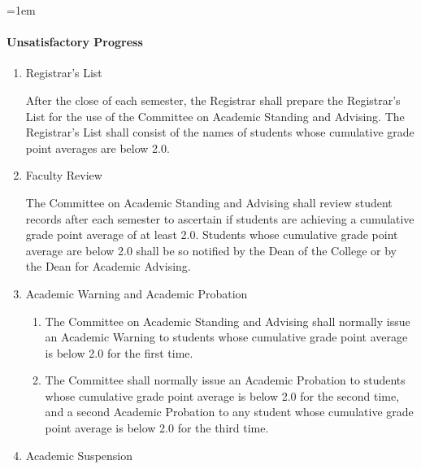 \documentclass{manual}
\let\oldparagraph\paragraph
\renewcommand\paragraph{\leftskip=1em\oldparagraph}
\newcommand{\itemLevelA}{\alph*.}
\newcommand{\itemLevelB}{\arabic*)}
\newcommand{\itemRefA}{\alph*}
\newcommand{\itemRefB}{\arabic*}
\begin{document}
\paragraph{Unsatisfactory Progress}\label{par:UnsatisfactoryProgress}

\begin{enumerate}[label=\itemLevelA,ref=\itemRefA]

\item Registrar's List 

      After the close of each semester, the Registrar shall prepare the Registrar's List for the use of the        Committee on Academic Standing and Advising. The Registrar's List shall consist of the names of        students whose cumulative grade point averages are below 2.0.


\item Faculty Review         

The Committee on Academic Standing and Advising shall review student records after each semester to ascertain if students are achieving a cumulative grade point average of at least 2.0. Students whose cumulative grade point average are below 2.0 shall be so notified by the Dean of the College or by the Dean for Academic Advising.


\item Academic Warning and Academic Probation        

\begin{enumerate}[label=\itemLevelB,ref=\itemRefB]
\item The Committee on Academic Standing and Advising shall normally issue an Academic Warning to students whose cumulative grade point average is below 2.0 for the first time. 
\item The Committee shall normally issue an Academic Probation to students whose cumulative grade point average is below 2.0 for the second time, and a second Academic Probation to any student whose cumulative grade point average is below 2.0 for the third time. 
\end{enumerate}

\item Academic Suspension

\begin{enumerate}[label=\itemLevelB,ref=\itemRefB]


\end{enumerate}
\end{enumerate}
\end{document}
